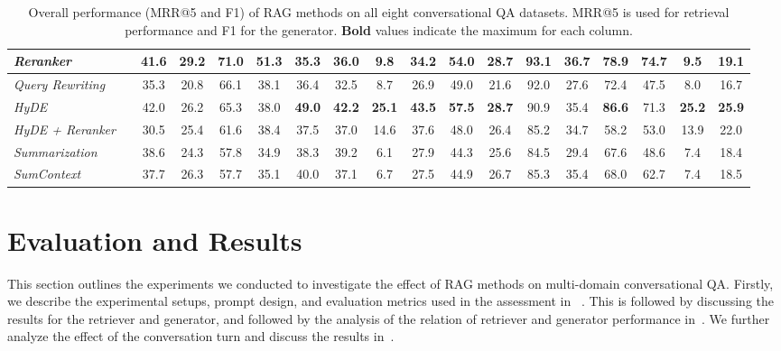 \documentclass[11pt]{article}
\begin{document}
\begin{table}[!th]
{\begin{tabular}{l l|cc|cc|cc|cc||cc|cc||cc|cc}
\textit{Reranker} & & 41.6 & \textbf{29.2} & \textbf{71.0} & \textbf{51.3} & 35.3 & 36.0 & 9.8 & 34.2 & 54.0 & \textbf{28.7} & \textbf{93.1} & 36.7 & 78.9 & \textbf{74.7} & 9.5 & 19.1 \\
\hline
\textit{Query Rewriting} & & 35.3 & 20.8 & 66.1 & 38.1 & 36.4 & 32.5 & 8.7 & 26.9 & 49.0 & 21.6 & 92.0 & 27.6 & 72.4 & 47.5 & 8.0 & 16.7 \\
\textit{HyDE} & & 42.0 & 26.2 & 65.3 & 38.0 & \textbf{49.0} & \textbf{42.2} & \textbf{25.1} & \textbf{43.5} & \textbf{57.5} & \textbf{28.7} & 90.9 & 35.4 & \textbf{86.6} & 71.3 & \textbf{25.2} & \textbf{25.9} \\
\textit{HyDE + Reranker} & & 30.5 & 25.4 & 61.6 & 38.4 & 37.5 & 37.0 & 14.6 & 37.6 & 48.0 & 26.4 & 85.2 & 34.7 & 58.2 & 53.0 & 13.9 & 22.0 \\
\textit{Summarization} & & 38.6 & 24.3 & 57.8 & 34.9 & 38.3 & 39.2 & 6.1 & 27.9 & 44.3 & 25.6 & 84.5 & 29.4 & 67.6 & 48.6 & 7.4 & 18.4 \\
\textit{SumContext} & & 37.7 & 26.3 & 57.7 & 35.1 & 40.0 & 37.1 & 6.7 & 27.5 & 44.9 & 26.7 & 85.3 & 35.4 & 68.0 & 62.7 & 7.4 & 18.5 \\
\bottomrule
\end{tabular}
}
\caption{Overall performance (MRR@5 and F1) of RAG methods on all eight conversational QA datasets. MRR@5 is used for retrieval performance and F1 for the generator. \textbf{Bold} values indicate the maximum for each column.}
\label{tab:rag_f1_mrr_final}
\end{table}


\section{Evaluation and Results} \label{sec:data}

This section outlines the experiments we conducted to investigate the effect of RAG methods on multi-domain conversational QA. Firstly, we describe the experimental setups, prompt design, and evaluation metrics used in the assessment in ~. This is followed by discussing the results for the retriever and generator, and followed by the analysis of the relation of retriever and generator performance in~. We further analyze the effect of the conversation turn and discuss the results in~.
\end{document}
